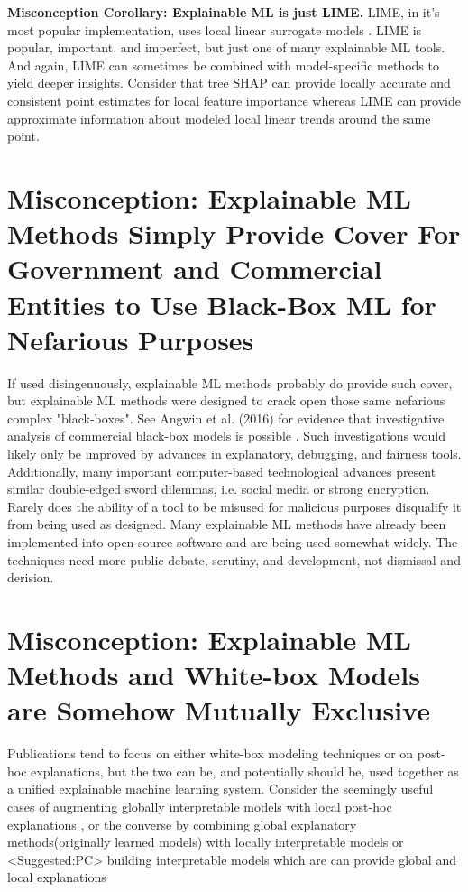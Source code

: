 \documentclass{article}
\begin{document}
\textbf{Misconception Corollary: Explainable ML is just LIME.} LIME, in it's most popular implementation, uses local linear surrogate models \cite{lime}. LIME is popular, important, and imperfect, but just one of many explainable ML tools. And again, LIME can sometimes be combined with model-specific methods to yield deeper insights. Consider that tree SHAP can provide locally accurate and consistent point estimates for local feature importance whereas LIME can provide approximate information about modeled local linear trends around the same point.   

\section{Misconception: Explainable ML Methods Simply Provide Cover For Government and Commercial Entities to Use Black-Box ML for Nefarious Purposes}

If used disingenuously, explainable ML methods probably do provide such cover, but explainable ML methods were designed to crack open those same nefarious complex "black-boxes". See Angwin et al. (2016) for evidence that investigative analysis of commercial black-box models is possible \cite{angwin16}. Such investigations would likely only be improved by advances in explanatory, debugging, and fairness tools. \\

Additionally, many important computer-based technological advances present similar double-edged sword dilemmas, i.e. social media or strong encryption. Rarely does the ability of a tool to be misused for malicious purposes disqualify it from being used as designed. Many explainable ML methods have already been implemented into open source software and are being used somewhat widely. The techniques need more public debate, scrutiny, and development, not dismissal and derision.

\section{Misconception: Explainable ML Methods and White-box Models are Somehow Mutually Exclusive}

Publications tend to focus on either white-box modeling techniques or on post-hoc explanations, but the two can be, and potentially should be, used together as a unified explainable machine learning system. Consider the seemingly useful cases of augmenting globally interpretable models with local post-hoc explanations \cite{lakkaraju2017interpretable}, or the converse by combining global explanatory methods(originally learned models) with locally interpretable models or <Suggested:PC> building interpretable models which are can provide global and local explanations \cite{lakkaraju2016interpretable}
\end{document}
